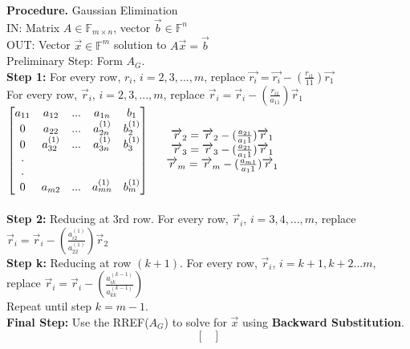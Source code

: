 \documentclass [12pt]{article}
\begin{document}
\begin{framed}
\noindent\textbf{Procedure. }Gaussian Elimination\\
IN: Matrix $A\in\mathbb{F}_{m\times n}$, vector $\overrightarrow{b}\in\mathbb{F}^n$\\
OUT: Vector $\overrightarrow{x}\in\mathbb{F}^m$ solution to $A\overrightarrow{x}=\overrightarrow{b}$\\
Preliminary Step: Form $A_G$.\\
\textbf{Step 1:} For every row, $r_i$, $i=2,3,...,m$, replace $\overrightarrow{r_i}=\overrightarrow{r_i}-(\frac{r_{i1}}{11})\overrightarrow{r_1}$\\
For every row, $\overrightarrow{r}_i$, $i=2,3,...,m$, replace $\overrightarrow{r}_i=\overrightarrow{r}_i-(\frac{r_{i1}}{a_{11}})\overrightarrow{r}_1$\\
$\begin{bmatrix}
a_{11}&a_{12}&...&a_{1n}&b_1\\
0&a_{22}&...&a_{2n}^{(1)}&b_2^{(1)}\\
0&a_{32}^{(1)}&...&a_{3n}^{(1)}&b_3^{(1)}\\
.\\
.\\
0&a_{m2}&...&a_{mn}^{(1)}&b_m^{(1)}
\end{bmatrix}\indent\begin{matrix} \overrightarrow{r}_2=\overrightarrow{r}_2-(\frac{a_{21}}{a_11})\overrightarrow{r}_1\\
\overrightarrow{r}_3=\overrightarrow{r}_3-(\frac{a_{21}}{a_11})\overrightarrow{r}_1\\
\overrightarrow{r}_m=\overrightarrow{r}_m-(\frac{a_{m1}}{a_11})\overrightarrow{r}_1
\end{matrix}$\\\\
\textbf{Step 2:} Reducing at 3rd row. For every row, $\overrightarrow{r}_i$, $i=3,4,...,m$, replace $\overrightarrow{r}_i=\overrightarrow{r}_i-(\frac{a_{i2}^{(1)}}{a_{22}^{(1)}})\overrightarrow{r}_2$\\
\textbf{Step k:} Reducing at row $(k+1)$. For every row, $\overrightarrow{r}_i$, $i=k+1,k+2...m$, replace $\overrightarrow{r}_i=\overrightarrow{r}_i-(\frac{a_{ik}^{(k-1)}}{a_{kk}^{(k-1)}})$\\
Repeat until step $k=m-1$.\\
\textbf{Final Step:} Use the RREF($A_G$) to solve for $\overrightarrow{x}$ using \textbf{Backward Substitution}.\\
$$\begin{bmatrix}

\end{bmatrix}$$
\end{framed}
\end{document}
